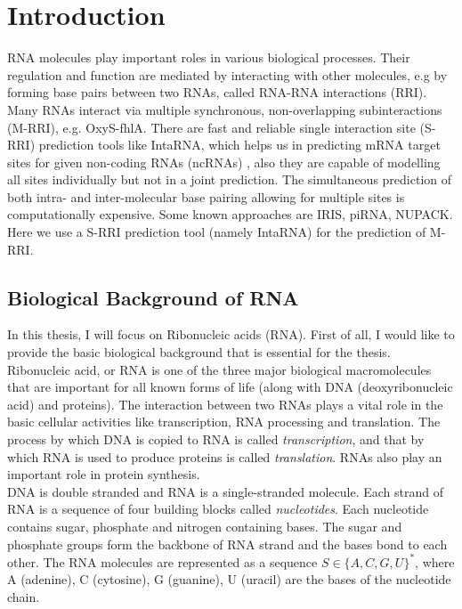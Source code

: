 \documentclass[twoside,a4paper]{report}
\numberwithin{equation}{section}
\begin{document}
	\chapter{Introduction}
	RNA molecules play important roles in various biological processes. Their regulation and function are mediated by interacting with other molecules, e.g by forming base pairs between two RNAs, called RNA-RNA interactions (RRI).  Many RNAs interact via multiple synchronous, non-overlapping subinteractions (M-RRI), e.g. OxyS-fhlA. There are fast and reliable single interaction site (S-RRI) prediction tools like IntaRNA, which helps us in predicting mRNA target sites for given non-coding RNAs (ncRNAs) , also they are capable of modelling all sites individually but not in a joint prediction. The simultaneous prediction of both intra- and inter-molecular base pairing allowing for multiple sites is computationally expensive. Some known approaches are IRIS, piRNA, NUPACK. Here we use a S-RRI prediction tool (namely IntaRNA) for the prediction of M-RRI.
	
	\section{Biological Background of RNA}
	In this thesis, I will focus on Ribonucleic acids (RNA). First of all, I would like to provide the basic biological background that is essential for the thesis. Ribonucleic acid, or RNA is one of the three major biological macromolecules that are important for all known forms of life (along with DNA (deoxyribonucleic acid) and proteins). The interaction between two RNAs plays a vital role in the basic cellular activities like transcription, RNA processing and translation. The process by which DNA is copied to RNA is called \textit{transcription}, and that by which RNA is used to produce proteins is called \textit{translation}. RNAs also play an important role in protein synthesis. \\
	
	 DNA is double stranded and RNA is a single-stranded molecule. Each strand of RNA is a sequence of four building blocks called \textit{nucleotides}. Each nucleotide contains sugar, phosphate and nitrogen containing bases. The sugar and phosphate groups form the backbone of RNA strand and the bases bond to each other. The RNA molecules are represented as a sequence $S \in \{A, C, G, U\} ^*$, where A (adenine), C (cytosine), G (guanine), U (uracil) are the bases of the nucleotide chain.\\
	 
\end{document}
